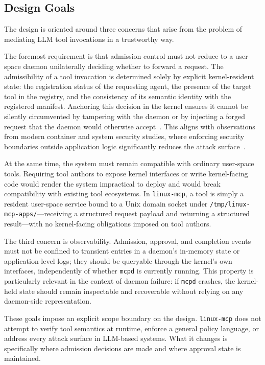 \subsection{Design Goals}

The design is oriented around three concerns that arise from the problem of mediating LLM tool invocations in a trustworthy way.

The foremost requirement is that admission control must not reduce to a user-space daemon unilaterally deciding whether to forward a request.
The admissibility of a tool invocation is determined solely by explicit kernel-resident state: the registration status of the requesting agent, the presence of the target tool in the registry, and the consistency of its semantic identity with the registered manifest.
Anchoring this decision in the kernel ensures it cannot be silently circumvented by tampering with the daemon or by injecting a forged request that the daemon would otherwise accept~\cite{narayan2020shreds, spencer1999flask}.
This aligns with observations from modern container and system security studies, where enforcing security boundaries outside application logic significantly reduces the attack surface~\cite{xu2021container}.

At the same time, the system must remain compatible with ordinary user-space tools.
Requiring tool authors to expose kernel interfaces or write kernel-facing code would render the system impractical to deploy and would break compatibility with existing tool ecosystems.
In \texttt{linux-mcp}, a tool is simply a resident user-space service bound to a Unix domain socket under \texttt{/tmp/linux-mcp-apps/}---receiving a structured request payload and returning a structured result---with no kernel-facing obligations imposed on tool authors.

The third concern is observability.
Admission, approval, and completion events must not be confined to transient entries in a daemon's in-memory state or application-level logs; they should
be queryable through the kernel's own interfaces, independently of whether \texttt{mcpd} is currently running.
This property is particularly relevant in the context of daemon failure: if \texttt{mcpd} crashes, the kernel-held state should remain inspectable and recoverable without relying on any daemon-side representation.

These goals impose an explicit scope boundary on the design.
\texttt{linux-mcp} does not attempt to verify tool semantics at runtime, enforce a general policy language, or address every attack surface in LLM-based systems.
What it changes is specifically where admission decisions are made and where approval state is maintained.



